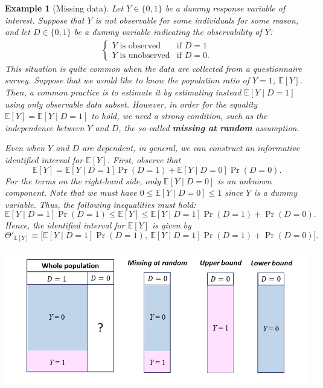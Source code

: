\documentclass[10.5pt, A4paper, openany, uplatex]{book}
\newcommand{\E}{\mathbb{E}}
\newtheorem{example}[theorem]{Example}
\numberwithin{equation}{section}
\begin{document}
\begin{example}[Missing data]\upshape
	Let $Y \in \{0, 1\}$ be a dummy response variable of interest.
	Suppose that $Y$ is not observable for some individuals for some reason, and let $D \in \{0, 1\}$ be a dummy variable indicating the observability of $Y$:
	\begin{align*}
	\left\{ 
	\begin{array}{ll}
	\text{$Y$ is observed} & \text{if $D = 1$}\\
	\text{$Y$ is unobserved} & \text{if $D = 0$}.
	\end{array}\right.
	\end{align*}
	This situation is quite common when the data are collected from a questionnaire survey.
	Suppose that we would like to know the population ratio of $Y = 1$, $\E [Y]$.
	Then, a common practice is to estimate it by estimating instead $\E [Y \mid D = 1]$ using only observable data subset.
	However, in order for the equality $\E [Y] = \E[Y \mid D = 1]$ to hold, we need a strong condition, such as the independence 	between $Y$ and $D$, the so-called \textbf{missing at random} assumption.

	Even when $Y$ and $D$ are dependent, in general, we can construct an informative identified interval for $\E [Y]$.
	First, observe that
	\[
		\E[Y] = \E[Y \mid D = 1] \Pr(D = 1) + \E[Y \mid D = 0] \Pr(D = 0).
	\]
	For the terms on the right-hand side, only $\E [Y \mid D = 0]$ is an unknown component.
	Note that we must have $0 \le \E[Y \mid D = 0] \le 1$ since $Y$ is a dummy variable.
	Thus, the following inequalities must hold:
	\[
		\E[Y \mid D = 1] \Pr(D = 1) \le \E[Y] \le \E[Y \mid D = 1] \Pr(D = 1) + \Pr(D = 0).
	\]
	Hence, the identified interval for $\E [Y ]$ is given by
	\[
		\Theta'_{\E[Y]} \equiv \Big[ \E[Y \mid D = 1] \Pr(D = 1), \: \E[Y \mid D = 1] \Pr(D = 1) + \Pr(D = 0) \Big] .
	\]

	\begin{center}
		\includegraphics[width=15cm]{partialident.png}
	\end{center}


\end{example}
\end{document}
